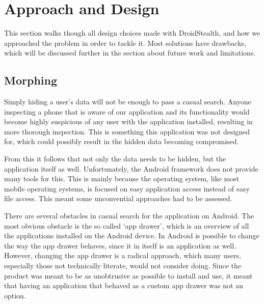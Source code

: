 \section{Approach and Design}
\label{sec:approach-and-design}
This section walks though all design choices made with DroidStealth,
and how we approached the problem in order to tackle it. Most 
solutions have drawbacks, which will be discussed further in the
section about future work and limitations. %


\subsection{Morphing}
\label{sec:approach-and-design:morphing}

Simply hiding a user's data will not be enough to pass a casual search. 
Anyone inspecting a phone that is aware of our application and its functionality would become highly suspicious of any user with the application installed, resulting in more thorough inspection. 
This is something this application was not designed for, which could possibly result in the hidden data becoming compromised. 

From this it follows that not only the data needs to be hidden, but the application itself as well. 
Unfortunately, the Android framework does not provide many tools for this. 
This is mainly because the operating system, like most mobile operating systems, is focused on easy application access instead of easy file access. 
This meant some unconvential approaches had to be assessed.

There are several obstacles in casual search for the application on Android. 
The most obvious obstacle is the so called `app drawer', which is an overview of all the applications installed on the Android device.
In Android is possible to change the way the app drawer behaves, since it in itself is an application as well.
However, changing the app drawer is a radical approach, which many users, especially those not technically literate, would not consider doing.
Since the product was meant to be as unobtrusive as possible to install and use, it meant that having an application that behaved as a custom app drawer was not an option.

